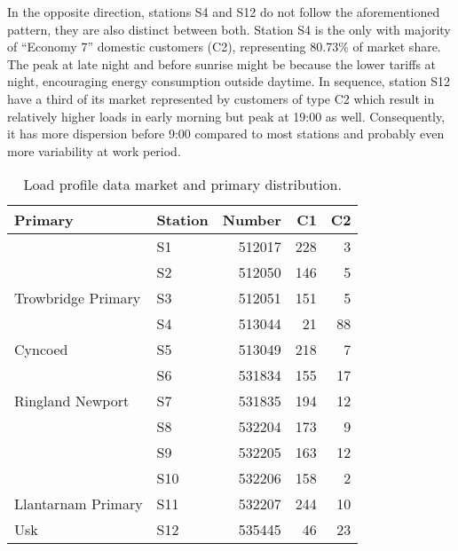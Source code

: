 In the opposite direction, stations S4 and S12 do not follow the aforementioned pattern, they are also distinct between both. Station S4 is the only with majority of  ``Economy 7'' domestic customers  (C2), representing 80.73\% of market share. The peak at late night and before sunrise might be because the lower tariffs at night, encouraging energy consumption outside daytime. In sequence, station S12 have a third of its market represented by customers of type C2 which result in relatively higher loads in early morning but peak at 19:00 as well. Consequently, it has more dispersion before 9:00 compared to most stations and probably even more variability at work period.


\begin{table}[b]\centering
  \caption{Load profile data market and primary distribution.}
  \label{tab:gavin-mkt}
\begin{knitrout}
\color{fgcolor}
\begin{tabular}{llrrr}
\toprule
Primary & Station & Number & C1 & C2\\
\midrule
 & S1 & 512017 & 228 & 3\\

 & S2 & 512050 & 146 & 5\\

\multirow{-3}{*}{\raggedright\arraybackslash Trowbridge Primary} & S3 & 512051 & 151 & 5\\
\cmidrule{1-5}
 & S4 & 513044 & 21 & 88\\

\multirow{-2}{*}{\raggedright\arraybackslash Cyncoed} & S5 & 513049 & 218 & 7\\
\cmidrule{1-5}
 & S6 & 531834 & 155 & 17\\

\multirow{-2}{*}{\raggedright\arraybackslash Ringland Newport} & S7 & 531835 & 194 & 12\\
\cmidrule{1-5}
 & S8 & 532204 & 173 & 9\\

 & S9 & 532205 & 163 & 12\\

 & S10 & 532206 & 158 & 2\\

\multirow{-4}{*}{\raggedright\arraybackslash Llantarnam Primary} & S11 & 532207 & 244 & 10\\
\cmidrule{1-5}
Usk & S12 & 535445 & 46 & 23\\
\bottomrule
\end{tabular}


\end{knitrout}
\end{table}

